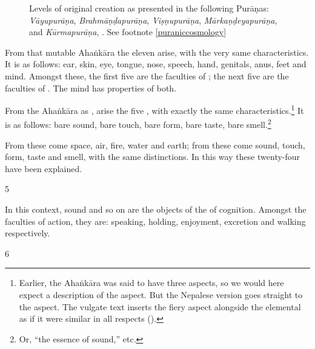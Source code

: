 \begin{translation}
\begin{figure}
\begin{tikzpicture}[
    node distance=0.4cm,
    every node/.style={font=\itshape},
    box/.style={align=center}
    ]
\end{tikzpicture}
              
                \caption{Levels of original creation as presented in the following 
                Purāṇas: \emph{Vāyupurāṇa}, \emph{Brahmāṇḍapurāṇa}, 
                \emph{Viṣṇupurāṇa}, \emph{Mārkaṇḍeyapurāṇa}, 
                and \emph{Kūrmapurāṇa}, \citep[after][27]{biar-1981}. 
                See footnote \ref{puraniccosmology}}
                \label{fig:biardeau1981-p27}
            \end{figure}
            
          
            
            
            From that mutable Ahaṅkāra the 
            eleven  arise, with the very same
            characteristics. It is as follows: ear, skin, eye, tongue, nose,
            speech, hand, genitals, anus, feet and mind.  Amongst these, the first 
            five are the faculties of ; the next five are the 
            faculties of .  The mind has properties of both.
            
            From the Ahaṅkāra as , arise the five ,
with exactly the same characteristics.\footnote{Earlier,
    the Ahaṅkāra was said to have three aspects, so we would
    here expect a description of the 
    aspect.  But the Nepalese version goes straight to the
     aspect.  The vulgate text inserts
    the fiery aspect alongside the elemental as if it were
    similar in all respects ().}  It is as
    follows: bare sound, bare touch, bare form, bare taste,
    bare smell.\footnote{Or, ``the essence of sound,'' etc.}
    
    From these  come space, air, fire, water and earth; 
    from these come sound, touch, form, taste and smell, with the same 
    distinctions.  In this way these twenty-four  have 
    been explained. 
            
\item[5]    

In this context, sound and so on are the objects of the  of 
cognition.  Amongst the faculties of action, they are: speaking, holding, 
enjoyment, excretion and walking respectively.  

\item[6]


\end{translation}
